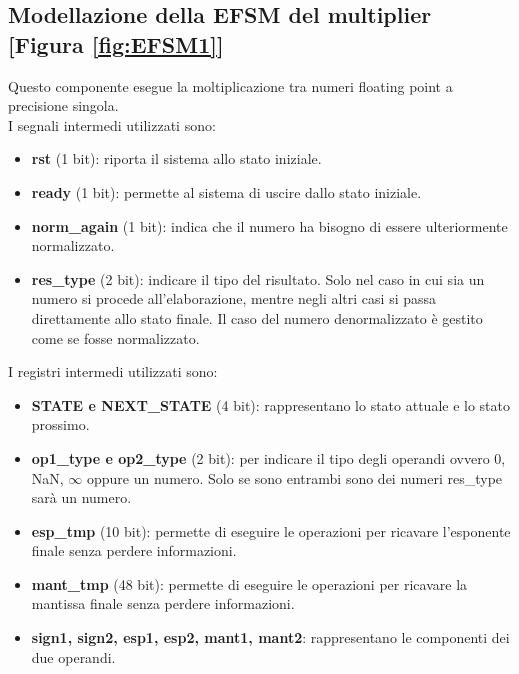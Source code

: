 \documentclass[]{IEEEtran}
\begin{document}
\subsection{Modellazione della EFSM del multiplier [Figura \ref{fig:EFSM1}]}
Questo componente esegue la moltiplicazione tra numeri floating point a precisione singola.
\\I segnali intermedi utilizzati sono:
\begin{itemize}
    \item \textbf{rst} (1 bit): riporta il sistema allo stato iniziale.
    \item \textbf{ready} (1 bit): permette al sistema di uscire dallo stato iniziale.
    \item \textbf{norm\_again} (1 bit): indica che il numero ha bisogno di essere ulteriormente normalizzato.
    \item \textbf{res\_type} (2 bit): indicare il tipo del risultato. Solo nel caso in cui sia un numero si procede all'elaborazione, mentre negli altri casi si passa direttamente allo stato finale. Il caso del numero denormalizzato è gestito come se fosse normalizzato.
\end{itemize}

I registri intermedi utilizzati sono:
\begin{itemize}
    \item \textbf{STATE e NEXT\_STATE} (4 bit): rappresentano lo stato attuale e lo stato prossimo.
    \item \textbf{op1\_type e op2\_type} (2 bit): per indicare il tipo degli operandi ovvero 0, NaN, $\infty$ oppure un numero. Solo se sono entrambi sono dei numeri res\_type sarà un numero.
    \item \textbf{esp\_tmp} (10 bit): permette di eseguire le operazioni per ricavare l'esponente finale senza perdere informazioni.
    \item \textbf{mant\_tmp} (48 bit): permette di eseguire le operazioni per ricavare la mantissa finale senza perdere informazioni.
    \item \textbf{sign1, sign2, esp1, esp2, mant1, mant2}: rappresentano le componenti dei due operandi.
\end{itemize}
\end{document}
